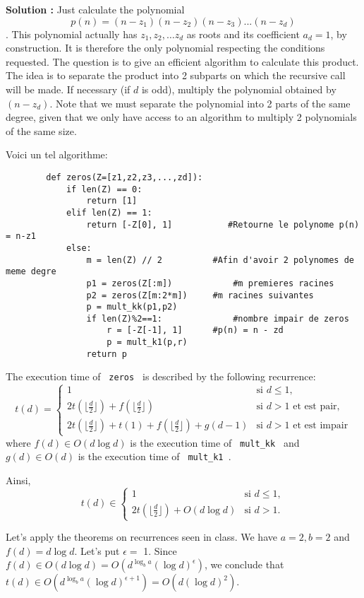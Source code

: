 \documentclass[11pt]{article} %
\newenvironment{solution}[1][\unskip]{%
	\par
	\noindent
	\textbf{Solution #1:}
	\noindent}
{\medskip}
\begin{document}
	\begin{solution}
		Just calculate the polynomial $$ p (n) = (n-z_1) (n-z_2) (n-z_3) ... (n-z_d) $$. This polynomial actually has $ z_1, z_2, \dots z_d $ as roots and its coefficient $ a_d = 1 $, by construction. It is therefore the only polynomial respecting the conditions requested. The question is to give an efficient algorithm to calculate this product.\\
		
		The idea is to separate the product into 2 subparts on which the recursive call will be made. If necessary (if $ d $ is odd), multiply the polynomial obtained by $ (n-z_d) $. Note that we must separate the polynomial into 2 parts of the same degree, given that we only have access to an algorithm to multiply 2 polynomials of the same size.
		
		
		Voici un tel algorithme:
		\begin{lstlisting}
		def zeros(Z=[z1,z2,z3,...,zd]):
			if len(Z) == 0:
				return [1]
			elif len(Z) == 1:
				return [-Z[0], 1]		    #Retourne le polynome p(n) = n-z1
			else:
				m = len(Z) // 2			 #Afin d'avoir 2 polynomes de meme degre
				p1 = zeros(Z[:m])			 #m premieres racines
				p2 = zeros(Z[m:2*m]) 	 #m racines suivantes
				p = mult_kk(p1,p2)		
				if len(Z)%2==1: 			 #nombre impair de zeros
					r = [-Z[-1], 1]		 #p(n) = n - zd
					p = mult_k1(p,r)
				return p
		\end{lstlisting}
		The execution time of \verb | zeros | is described by the following recurrence:
		\begin{equation*}
		t(d) = \left\{
		\begin{array}{ll}
		1 & \text{si } d \leq 1,\\
		2t(\lfloor\frac{d}{2}\rfloor)+f(\lfloor\frac{d}{2}\rfloor) & \text{si } d> 1 \text{ et est pair}, \\
		2t(\lfloor\frac{d}{2}\rfloor)+ t(1) + f(\lfloor\frac{d}{2}\rfloor) + g(d-1) & \text{si } d> 1 \text{ et est impair}
		\end{array} \right.
		\end{equation*}
		where $ f(d) \in O (d \log d) $ is the execution time of \verb | mult_kk | and $ g(d) \in O (d) $ is the execution time of \verb | mult_k1 |.
		
		Ainsi, 
		\begin{equation*}
		t(d) \in \left\{
		\begin{array}{ll}
		1 & \text{si } d \leq 1,\\
		2t(\lfloor\frac{d}{2}\rfloor)+O(d\log d) & \text{si } d> 1.
		\end{array} \right.
		\end{equation*}

		Let's apply the theorems on recurrences seen in class. We have $ a = 2, b = 2 $ and $ f (d) = d \log d $. Let's put $ \epsilon = $ 1. Since $ f (d) \in O (d \log d) = O (d ^ {\log_b a} (\log d) ^ {\epsilon}) $, we conclude that $ t (d) \in O ( d ^ {\log_b a} (\log d) ^ {\epsilon + 1}) = O (d (\log d) ^ 2) $.
		
	\end{solution}
	
\end{document}
